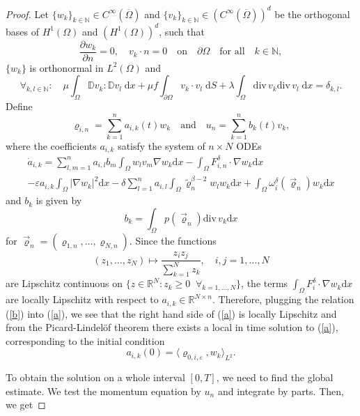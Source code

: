 \documentclass[11pt]{article}
\newcommand{\dd}{\mathrm{d}}
\newcommand{\ddiv}{\mathrm{div\,}}
\numberwithin{equation}{section}
\numberwithin{tw}{section}
\begin{document}
\begin{proof} Let $\{w_k\}_{k\in\mathbb{N}}\in C^\infty(\overline{\Omega})$ and $\{v_k\}_{k\in\mathbb{N}}\in (C^\infty(\overline{\Omega}))^d$ be the orthogonal bases of $H^1(\Omega)$ and $(H^1(\Omega))^d$, such that
\[ \frac{\partial w_k}{\partial n} = 0, \quad v_k\cdot n=0 \quad \text{on} \quad \partial\Omega \quad \text{for all} \quad k\in\mathbb{N}, \]
$\{w_k\}$ is orthonormal in $L^2(\Omega)$ and
\[ \forall_{k,l\in\mathbb{N}}: \quad \mu\int_\Omega \mathbb{D} v_k:\mathbb{D} v_l \;\dd x + \mu f\int_{\partial\Omega} v_k\cdot v_l\;\dd S + \lambda\int_\Omega \ddiv v_k\ddiv v_l\;\dd x = \delta_{k,l}. \]
Define
\[ \varrho_{i,n}=\sum_{k=1}^n a_{i,k}(t)w_k \quad
\text{and} \quad u_n = \sum_{k=1}^n b_k(t)v_k, \]
where the coefficients $a_{i,k}$ satisfy the system of $n\times N$ ODEs
\begin{multline}\label{a} \dot a_{i,k} = \sum_{l,m=1}^n a_{i,l}b_m\int_\Omega w_l v_m\nabla w_k \dd x - \int_\Omega F_{i,n}^\delta\cdot\nabla w_k\dd x \\
- \varepsilon a_{i,k}\int_\Omega |\nabla w_k|^2\dd x - \delta\sum_{l=1}^n a_{i,l}\int_\Omega \tilde\varrho_n^{\beta-2}w_lw_k\dd x + \int_\Omega \omega_i^\delta(\vec\varrho_n) w_k \dd x \end{multline}
and $b_k$ is given by
\begin{equation}\label{b} b_k = \int_\Omega p(\vec\varrho_n)\ddiv v_k \dd x \end{equation}
for $\vec\varrho_n = (\varrho_{1,n},\dots,\varrho_{N,n})$. Since the functions
\[ (z_1,\dots,z_N)\mapsto \frac{z_iz_j}{\sum_{k=1}^N z_k}, \quad i,j=1,\dots,N \]
are Lipschitz continuous on $\{z\in\mathbb{R}^N: z_k\geq 0 \;\; \forall_{k=1,\dots,N}\}$, the terms $\displaystyle\int_\Omega F_i^\delta\cdot\nabla w_k\dd x$ are locally Lipschitz with respect to $a_{i,k}\in\mathbb{R}^{N\times n}$. Therefore, plugging the relation (\ref{b}) into (\ref{a}), we see that the right hand side of (\ref{a}) is locally Lipschitz and from the Picard-Lindel\"of theorem there exists a local in time solution to (\ref{a}), corresponding to the initial condition
\[ a_{i,k}(0) = \langle\varrho_{0,i,\varepsilon},w_k\rangle_{L^2}. \]

To obtain the solution on a whole interval $[0,T]$, we need to find the global estimate. We test the momentum equation by $u_n$ and integrate by parts. Then, we get


\end{proof}
\end{document}
